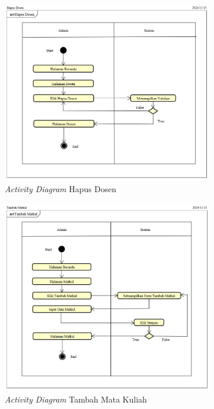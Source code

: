 \begin{figure}
	\centering
	\includegraphics[width=0.82\textwidth]{konten/gambar/activity-diagram/hapus-dosen.png}
	\caption{\textit{Activity Diagram} Hapus Dosen}
	\label{activity-diagram-hapus-dosen}
\end{figure}

\begin{figure}
	\centering
	\includegraphics[width=0.82\textwidth]{konten/gambar/activity-diagram/tambah-matkul.png}
	\caption{\textit{Activity Diagram} Tambah Mata Kuliah}
	\label{activity-diagram-tambah-matkul}
\end{figure}

